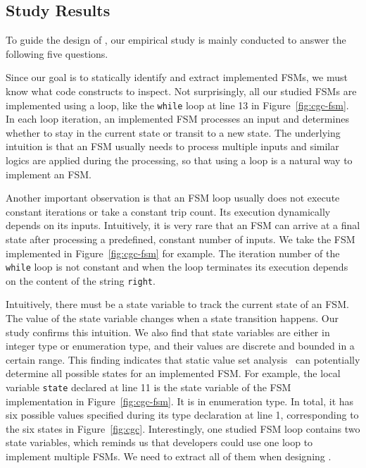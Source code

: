 


\subsection{Study Results}
To guide the design of \Tool{}, our empirical study
is mainly conducted to answer the following five questions. 



Since our goal is to statically identify and extract implemented FSMs,
we must know what code constructs to inspect.
Not surprisingly, all our studied FSMs are implemented using a loop,
like the \texttt{while} loop at line 13 in Figure~\ref{fig:cgc-fsm}.
In each loop iteration, an implemented FSM processes an input and
determines whether to stay in the current state or transit to a new state.
The underlying intuition is that an FSM usually needs to process
multiple inputs and similar logics are applied during the processing,
so that using a loop is a natural way to implement an FSM.

Another important observation is that
an FSM loop usually does not execute constant
iterations or take a constant trip count.
Its execution dynamically depends on its inputs. 
Intuitively, it is very rare that an FSM can arrive at a final
state after processing a predefined, constant number of inputs.
We take the FSM implemented in Figure~\ref{fig:cgc-fsm} for example.
The iteration number of the \texttt{while} loop is not constant and
when the loop terminates its execution  
depends on the content of the string \texttt{right}.

Intuitively, there must be a state variable to track the current state of an FSM.
The value of the state variable changes when a state transition happens.
Our study confirms this intuition.
We also find that state variables are either in integer type or enumeration type,
and their values are discrete and bounded in a certain range.
This finding indicates that static value set analysis~\cite{DEEPVSA,VSA}
can potentially determine all possible states for an implemented FSM.
For example, the local variable \texttt{state} declared at line 11
is the state variable of the FSM implementation in Figure~\ref{fig:cgc-fsm}.
It is in enumeration type.
In total, it has six possible values
specified during its type declaration at line 1,
corresponding to the six states in Figure~\ref{fig:cgc}.
Interestingly, one studied FSM loop contains two state variables,
which reminds us that developers could use one loop
to implement multiple FSMs.
We need to extract all of them when designing \Tool{}.




